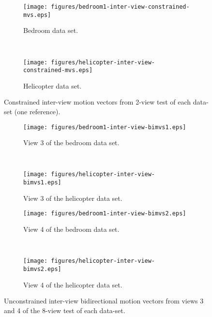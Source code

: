 \documentclass[12pt]{article}
\begin{document}
\begin{figure}
\centering
\begin{subfigure}{.5\textwidth}
\centering
\texttt{[image: figures/bedroom1-inter-view-constrained-mvs.eps]}
\caption{Bedroom data set.}
\end{subfigure} \\
\begin{subfigure}{.5\textwidth}
\centering
\texttt{[image: figures/helicopter-inter-view-constrained-mvs.eps]}
\caption{Helicopter data set.}
\end{subfigure}
\caption{Constrained inter-view motion vectors from 2-view test of each data-set (one reference).}
\end{figure}

\begin{figure}
\centering
\begin{subfigure}{.5\textwidth}
\centering
\texttt{[image: figures/bedroom1-inter-view-bimvs1.eps]}
\caption{View 3 of the bedroom data set.}
\end{subfigure} \\
\begin{subfigure}{.5\textwidth}
\centering
\texttt{[image: figures/helicopter-inter-view-bimvs1.eps]}
\caption{View 3 of the helicopter data set.}
\end{subfigure}
\begin{subfigure}{.5\textwidth}
\centering
\texttt{[image: figures/bedroom1-inter-view-bimvs2.eps]}
\caption{View 4 of the bedroom data set.}
\end{subfigure} \\
\begin{subfigure}{.5\textwidth}
\centering
\texttt{[image: figures/helicopter-inter-view-bimvs2.eps]}
\caption{View 4 of the helicopter data set.}
\end{subfigure}
\caption{
Unconstrained inter-view bidirectional motion vectors from views 3 and 4  of the
8-view test of each data-set.
}
\end{figure}
\end{document}
